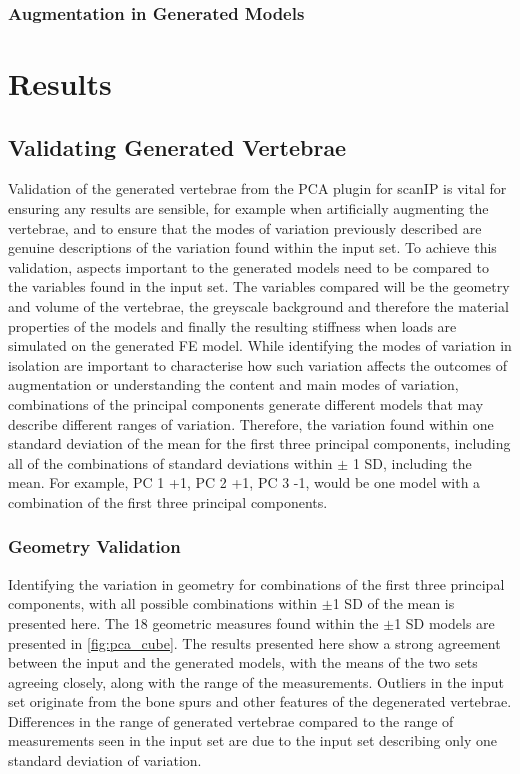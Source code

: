 \subsubsection{Augmentation in Generated Models}




\section{Results}

\subsection{Validating Generated Vertebrae} \label{sec:pca_val}

Validation of the generated vertebrae from the PCA plugin for scanIP is vital for ensuring any results are sensible, for example when artificially augmenting the vertebrae, and to ensure that the modes of variation previously described are genuine descriptions of the variation found within the input set.
To achieve this validation, aspects important to the generated models need to be compared to the variables found in the input set.
The variables compared will be the geometry and volume of the vertebrae, the greyscale background and therefore the material properties of the models and finally the resulting stiffness when loads are simulated on the generated FE model.
While identifying the modes of variation in isolation are important to characterise how such variation affects the outcomes of augmentation or understanding the content and main modes of variation, combinations of the principal components generate different models that may describe different ranges of variation.
Therefore, the variation found within one standard deviation of the mean for the first three principal components, including all of the combinations of standard deviations within $\pm$ 1 SD, including the mean.
For example, PC 1 +1, PC 2 +1, PC 3 -1, would be one model with a combination of the first three principal components.

\subsubsection{Geometry Validation}

Identifying the variation in geometry for combinations of the first three principal components, with all possible combinations within $\pm$1 SD of the mean is presented here.
The 18 geometric measures found within the $\pm$1 SD models are presented in \cref{fig:pca_cube}. 
The results presented here show a strong agreement between the input and the generated models, with the means of the two sets agreeing closely, along with the range of the measurements.
Outliers in the input set originate from the bone spurs and other features of the degenerated vertebrae. %
Differences in the range of generated vertebrae compared to the range of measurements seen in the input set are due to the input set describing only one standard deviation of variation.

